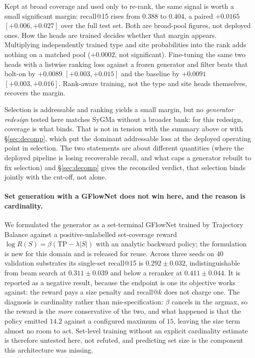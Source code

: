 Kept at broad coverage and used only to re-rank, the same signal is worth a small significant
margin: recall@15 rises from $0.388$ to $0.404$, a paired $+0.0165$ $[+0.006,+0.027]$ over the full
test set. Both are broad-pool figures, not deployed ones. How the heads are trained decides whether that margin appears. Multiplying
independently trained type and site probabilities into the rank adds nothing on a matched pool
($+0.0002$, not significant). Fine-tuning the same two heads with a listwise ranking loss against
a frozen generator and filter beats that bolt-on by $+0.0089$ $[+0.003,+0.015]$ and the baseline
by $+0.0091$ $[+0.003,+0.016]$. Rank-aware training, not the type and site heads themselves,
recovers the margin.

Selection is addressable and ranking yields a small margin, but no \emph{generator redesign} tested
here matches SyGMa without a broader bank: for this redesign, coverage is what binds. That is not
in tension with the summary above or with \S\ref{sec:decomp}, which put the dominant addressable
loss at the deployed operating point in selection. The two statements are about different
quantities (where the deployed pipeline is losing recoverable recall, and what caps a generator
rebuilt to fix selection) and \S\ref{sec:decomp} gives the reconciled verdict, that selection
binds jointly with the cut-off, not alone.

\paragraph{Set generation with a GFlowNet does not win here, and the reason is cardinality.}
We formulated the generator as a set-terminal GFlowNet trained by Trajectory Balance against a
positive-unlabelled set-coverage reward $\log R(S) = \beta(\mathrm{TP} - \lambda|S|)$ with an
analytic backward policy; the formulation is new for this domain and is released for reuse. Across
three seeds on 40 validation substrates its single-set recall@15 is $0.292\pm0.032$, indistinguishable
from beam search at $0.311\pm0.039$ and below a reranker at $0.411\pm0.044$. It is reported as a negative result, because the endpoint is one its objective works against:
the reward pays a size penalty and recall@$k$ does not charge one. The diagnosis is cardinality
rather than mis-specification: $\beta$ cancels in the argmax, so the reward is the \emph{more}
conservative of the two, and what happened is that the policy emitted $14.2$ against a configured
maximum of $15$, leaving the size term almost no room to act. Set-level training without an explicit
cardinality estimate is therefore untested here, not refuted, and predicting set size is the
component this architecture was missing.

